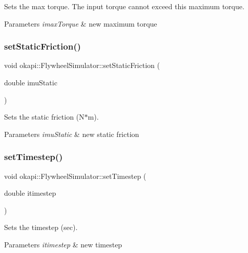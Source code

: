 Sets the max torque. The input torque cannot exceed this maximum torque.


\begin{DoxyParams}{Parameters}
{\em imax\+Torque} & new maximum torque \\
\hline
\end{DoxyParams}
\mbox{\label{classokapi_1_1FlywheelSimulator_a60d44d13592af17e4490245868e8db5a}} 
\subsubsection{\texorpdfstring{setStaticFriction()}{setStaticFriction()}}
{\footnotesize\ttfamily void okapi\+::\+Flywheel\+Simulator\+::set\+Static\+Friction (\begin{DoxyParamCaption}\item[{double}]{imu\+Static }\end{DoxyParamCaption})}

Sets the static friction (N$\ast$m).


\begin{DoxyParams}{Parameters}
{\em imu\+Static} & new static friction \\
\hline
\end{DoxyParams}
\mbox{\label{classokapi_1_1FlywheelSimulator_aba93a3606887d59536c47b0a1b1c6c6e}} 
\subsubsection{\texorpdfstring{setTimestep()}{setTimestep()}}
{\footnotesize\ttfamily void okapi\+::\+Flywheel\+Simulator\+::set\+Timestep (\begin{DoxyParamCaption}\item[{double}]{itimestep }\end{DoxyParamCaption})}

Sets the timestep (sec).


\begin{DoxyParams}{Parameters}
{\em itimestep} & new timestep \\
\hline
\end{DoxyParams}
\mbox{\label{classokapi_1_1FlywheelSimulator_a0e26fda9b8d46a12942a7ed5b8a0e399}} 
